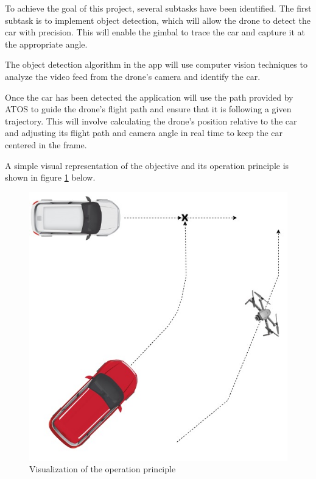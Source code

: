 
To achieve the goal of this project, several subtasks have been identified. The first subtask is to implement object detection, which will allow the drone to detect the car with precision. This will enable the gimbal to trace the car and capture it at the appropriate angle.

The object detection algorithm in the app will use computer vision techniques to analyze the video feed from the drone's camera and identify the car. 

Once the car has been detected the application will use the path provided by ATOS to guide the drone's flight path and ensure that it is following a given trajectory. This will involve calculating the drone's position relative to the car and adjusting its flight path and camera angle in real time to keep the car centered in the frame.

A simple visual representation of the objective and its operation principle is shown in figure \ref{fig:visualization} below.

\begin{figure}[H]
  \centering
  \includegraphics[width=0.75\columnwidth]{figure/traj.jpg}
  \caption{Visualization of the operation principle}
  \label{fig:visualization}
\end{figure}



